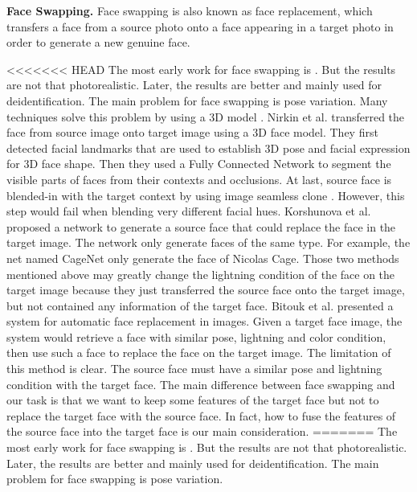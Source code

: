 \noindent\textbf{Face Swapping.} Face swapping is also known as face replacement, which transfers a face from a source photo onto a face appearing in a target photo in order to generate a new genuine face.

<<<<<<< HEAD
The most early work for face swapping is \cite{exchface}. But the results are not that photorealistic. Later, the results are better \cite{de1,de2,de3,de4} and mainly used for deidentification. The main problem for face swapping is pose variation.
Many techniques solve this problem by using a 3D model \cite{3d1,de3,onseg}. Nirkin et al. \cite{onseg} transferred the face from source image onto target image using a 3D face model. They first detected facial landmarks that are used to establish 3D pose and facial expression for 3D face shape. Then they used a Fully Connected Network to segment the visible parts of faces from their contexts and occlusions. At last, source face is blended-in with the target context by using image seamless clone \cite{pie}. However, this step would fail when blending very different facial hues. Korshunova et al. \cite{faceswapping} proposed a network to generate a source face that could replace the face in the target image. The network only generate faces of the same type. For example, the net named CageNet only generate the face of Nicolas Cage. Those two methods mentioned above may greatly change the lightning condition of the face on the target image because they just transferred the source face onto the target image, but not contained any information of the target face. Bitouk et al. \cite{autorep} presented a system for automatic face replacement in images. Given a target face image, the system would retrieve a face with similar pose, lightning and color condition, then use such a face to replace the face on the target image. The limitation of this method is clear. The source face must have a similar pose and lightning condition with the target face.
%
The main difference between face swapping and our task is that we want to keep some features of the target face but not to replace the target face with the source face. In fact, how to fuse the features of the source face into the target face is our main consideration.
=======
The most early work for face swapping is \cite{exchface}. But the results are not that photorealistic. Later, the results are better \cite{de1,de2,de3,de4} and mainly used for deidentification. The main problem for face swapping is pose variation. 
